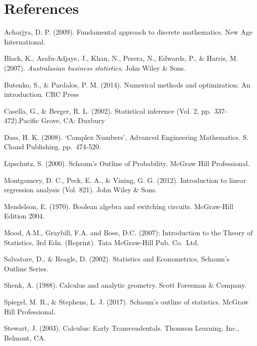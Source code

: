 \documentclass[]{book}
\begin{document}
\newpage

\hypertarget{references-9}{%
\chapter*{References}\label{references-9}}

Acharjya, D. P. (2009). Fundamental approach to discrete mathematics. New Age International.

Black, K., Asafu-Adjaye, J., Khan, N., Perera, N., Edwards, P., \& Harris, M. (2007). \emph{Australasian business statistics}. John Wiley \& Sons.

Butenko, S., \& Pardalos, P. M. (2014). Numerical methods and optimization: An introduction. CRC Press

Casella, G., \& Berger, R. L. (2002). Statistical inference (Vol. 2, pp.~337-472).Pacific Grove, CA: Duxbury

Dass, H. K. (2008). `Complex Numbers', Advanced Engineering Mathematics. S. Chand Publishing. pp.~474-520.

Lipschutz, S. (2000). Schaum's Outline of Probability. McGraw Hill Professional.

Montgomery, D. C., Peck, E. A., \& Vining, G. G. (2012). Introduction to linear regression analysis (Vol. 821). John Wiley \& Sons.

Mendelson, E. (1970). Boolean algebra and switching circuits. McGraw-Hill Edition 2004.

Mood, A.M., Graybill, F.A. and Boes, D.C. (2007): Introduction to the Theory of Statistics, 3rd Edn. (Reprint). Tata McGraw-Hill Pub. Co.~Ltd.

Salvatore, D., \& Reagle, D. (2002). Statistics and Econometrics, Schaum's Outline Series.

Shenk, A. (1988). Calculus and analytic geometry. Scott Foresman \& Company.

Spiegel, M. R., \& Stephens, L. J. (2017). Schaum's outline of statistics. McGraw Hill Professional.

Stewart, J. (2003). Calculus: Early Transcendentals. Thomson Learning. Inc., Belmont, CA.


\end{document}
